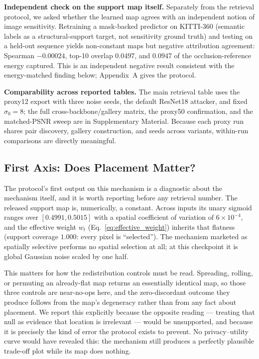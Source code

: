 \documentclass[10pt,journal]{IEEEtran}
\begin{document}
\textbf{Independent check on the support map itself.} Separately from the
retrieval protocol, we asked whether the learned map agrees with an
independent notion of image sensitivity. Retraining a mask-backed predictor on
KITTI-360 (semantic labels as a structural-support target, not sensitivity
ground truth) and testing on a held-out sequence yields non-constant maps but
negative attribution agreement: Spearman $-0.00024$, top-10 overlap 0.0497,
and 0.0947 of the occlusion-reference energy captured. This is an independent
negative result consistent with the energy-matched finding below; Appendix~A
gives the protocol.

\textbf{Comparability across reported tables.} The main retrieval table uses the proxy12 export with three noise seeds, the default ResNet18 attacker, and fixed $\sigma_0=8$; the full cross-backbone/gallery matrix, the proxy50 confirmation, and the matched-PSNR sweep are in Supplementary Material. Because each proxy run shares pair discovery, gallery construction, and seeds across variants, within-run comparisons are directly meaningful.

\subsection{First Axis: Does Placement Matter?}
\label{sec:causality}

The protocol's first output on this mechanism is a diagnostic about the
mechanism itself, and it is worth reporting before any retrieval number. The
released support map is, numerically, a constant. Across inputs its unary
sigmoid ranges over $[0.4991, 0.5015]$ with a spatial coefficient of variation
of $6\times10^{-4}$, and the effective weight $w_t$
(Eq.~\eqref{eq:effective_weight}) inherits that flatness (support coverage
$1.000$: every pixel is ``selected''). The mechanism marketed as spatially
selective performs no spatial selection at all; at this checkpoint it is
global Gaussian noise scaled by one half.

This matters for how the redistribution controls must be read. Spreading,
rolling, or permuting an already-flat map returns an essentially identical
map, so those three controls are near-no-ops here, and the zero-discordant
outcome they produce follows from the map's degeneracy rather than from any
fact about placement. We report this explicitly because the opposite reading
--- treating that null as evidence that location is irrelevant --- would be
unsupported, and because it is precisely the kind of error the protocol
exists to prevent. No privacy--utility curve would have revealed this: the
mechanism still produces a perfectly plausible trade-off plot while its map
does nothing.
\end{document}
